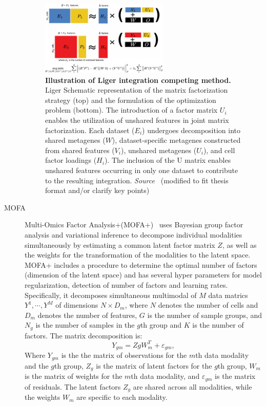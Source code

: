 \begin{description}
    \begin{figure}[!ht]
    	\centering
    	\includegraphics[width=0.6\textwidth]{Alg_Liger/fig}
    	\vspace{0.1cm}
    	\caption[Illustration of Liger integration competing method.]{\textbf{Illustration of Liger integration competing method.} Liger Schematic representation of the matrix factorization strategy (top) and the formulation of the optimization problem (bottom). The introduction of a factor matrix $U_i$ enables the utilization of unshared features in joint matrix factorization. Each dataset ($E_i$) undergoes decomposition into shared metagenes ($W$), dataset-specific metagenes constructed from shared features ($V_i$), unshared metagenes ($U_i$), and cell factor loadings ($H_i$). The inclusion of the U matrix enables unshared features occurring in only one dataset to contribute to the resulting integration. \emph{Source~\cite{kriebel2022uinmf}} (modified to fit thesis format and/or clarify key points)
    }
    	\label{fig:Alg_Liger}
    \end{figure}

    \item[MOFA]
    Multi-Omics Factor Analysis+(MOFA+)~\citep{argelaguet2020mofa+} uses Bayesian group factor analysis and variational inference to decompose individual modalities simultaneously by estimating a common latent factor matrix $Z$, as well as the weights for the transformation of the modalities to the latent space. MOFA+ includes a procedure to determine the optimal number of factors (dimension of the latent space) and has several hyper parameters for model regularization, detection of number of factors and learning rates. Specifically, it decomposes simultaneous multimodal of $M$ data matrics $Y^1, \cdots, Y^M$ of dimensions $N\times D_m$, where $N$ denotes the number of cells and $D_m$ denotes the number of features, $G$ is the number of sample groups, and $N_g$ is the number of samples in the $g$th group and $K$ is the number of factors. The matrix decomposition is:
    \begin{equation}
    Y_{gm} = ZgW_m^{T} + \varepsilon_{gm},
    \end{equation}
    Where $Y_{gm}$ is the the matrix of observations for the $m$th data modality and the $g$th group, $Z_g$ is the matrix of latent factors for the $g$th group, $W_m$ is the matrix of weights for the $m$th data modality, and $\varepsilon_{gm}$ is the matrix of residuals. The latent factors $Z_g$ are shared across all modalities, while the weights $W_m$ are specific to each modality. %


\end{description}
